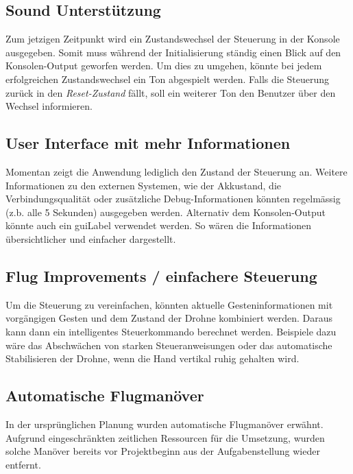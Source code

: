 \subsection{Sound Unterstützung}
Zum jetzigen Zeitpunkt wird ein Zustandswechsel der Steuerung in der Konsole ausgegeben.
Somit muss während der Initialisierung ständig einen Blick auf den Konsolen-Output geworfen werden.
Um dies zu umgehen, könnte bei jedem erfolgreichen Zustandswechsel ein Ton abgespielt werden.
Falls die Steuerung zurück in den \textit{Reset-Zustand} fällt, soll ein weiterer Ton den Benutzer über den Wechsel informieren.

\subsection{User Interface mit mehr Informationen}
Momentan zeigt die Anwendung lediglich den Zustand der Steuerung an.
Weitere Informationen zu den externen Systemen, wie der Akkustand, die Verbindungsqualität oder zusätzliche Debug-Informationen könnten regelmässig (z.b. alle 5 Sekunden) ausgegeben werden.
Alternativ dem Konsolen-Output könnte auch ein \gls{guiLabel} verwendet werden.
So wären die Informationen übersichtlicher und einfacher dargestellt.

\subsection{Flug Improvements / einfachere Steuerung}
Um die Steuerung zu vereinfachen, könnten aktuelle Gesteninformationen mit vorgängigen Gesten und dem Zustand der Drohne kombiniert werden. Daraus kann dann ein intelligentes Steuerkommando berechnet werden.
Beispiele dazu wäre das Abschwächen von starken Steueranweisungen oder das automatische Stabilisieren der Drohne, wenn die Hand vertikal ruhig gehalten wird.

\newpage
\subsection{Automatische Flugmanöver}
In der ursprünglichen Planung wurden automatische Flugmanöver erwähnt.
Aufgrund eingeschränkten zeitlichen Ressourcen für die Umsetzung, wurden solche Manöver bereits vor Projektbeginn aus der Aufgabenstellung wieder entfernt.

